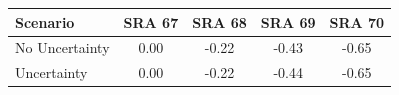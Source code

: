 \begin{tabular}{lcccc}
    \toprule
    Scenario & SRA 67 & SRA 68 & SRA 69 & SRA 70 \\
    \midrule
    No Uncertainty & 0.00 & -0.22 & -0.43 & -0.65 \\
    Uncertainty & 0.00 & -0.22 & -0.44 & -0.65 \\
    \bottomrule
\end{tabular}
